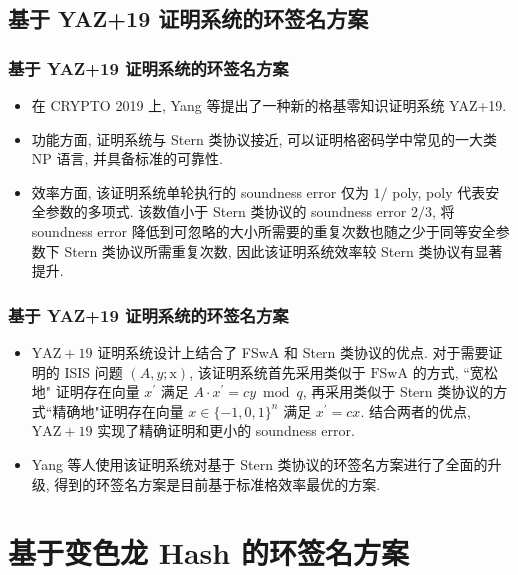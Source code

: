 \documentclass{beamer}
\begin{document}
\subsection{基于 YAZ+19 证明系统的环签名方案}
\begin{frame}
    \frametitle{基于 YAZ+19 证明系统的环签名方案}
    \begin{itemize}
        \item 在 CRYPTO 2019 上, Yang 等提出了一种新的格基零知识证明系统 YAZ+19. 
        \item 功能方面, 证明系统与 Stern 类协议接近, 可以证明格密码学中常见的一大类 $\mathrm{NP}$ 语言, 并具备标准的可靠性. 
        \item 效率方面, 该证明系统单轮执行的 soundness error 仅为 $1 /$ poly, poly 代表安全参数的多项式. 该数值小于 Stern 类协议的 soundness error $2 / 3$, 将 soundness error 降低到可忽略的大小所需要的重复次数也随之少于同等安全参数下 Stern 类协议所需重复次数, 因此该证明系统效率较 Stern 类协议有显著提升. 
        
        
    \end{itemize}
    

\end{frame}
\begin{frame}
    \frametitle{基于 YAZ+19 证明系统的环签名方案}

    \begin{itemize}
        \item $\mathrm{YAZ}+19$ 证明系统设计上结合了 FSwA 和 Stern 类协议的优点. 对于需要证明的 ISIS 问题 $(A, y ; \mathrm{x})$, 该证明系统首先采用类似于 $\mathrm{FSwA}$ 的方式, “宽松地" 证明存在向量 $x^{\prime}$ 满足 $A \cdot x^{\prime}=c y \bmod q$, 再采用类似于 Stern 类协议的方式“精确地"证明存在向量 $x \in\{-1,0,1\}^{n}$ 满足 $x^{\prime}=c x .$ 结合两者的优点, $\mathrm{YAZ}+19$ 实现了精确证明和更小的 soundness error.
        \item Yang 等人使用该证明系统对基于 Stern 类协议的环签名方案进行了全面的升级, 得到的环签名方案是目前基于标准格效率最优的方案. 
    \end{itemize}

\end{frame}

\section{基于变色龙 Hash 的环签名方案}
\begin{frame}
    \frametitle{}

    \sectionpage

\end{frame}
\end{document}
